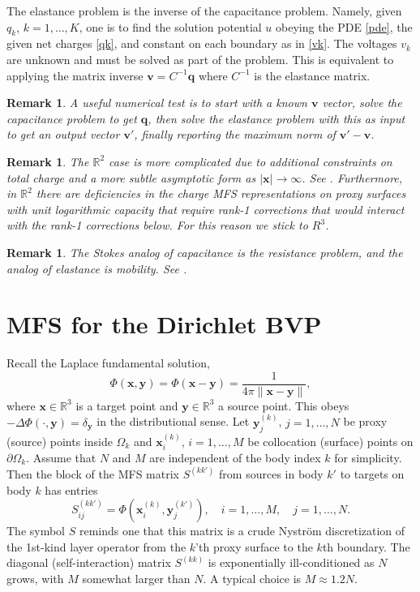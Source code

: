 \documentclass[10pt]{article}
\newcommand{\be}{\begin{equation}}
\newcommand{\ee}{\end{equation}}
\newcommand{\R}{\mathbb{R}}
\newtheorem{rmk}[thm]{Remark}
\newcommand{\x}{\mathbf{x}}
\newcommand{\y}{\mathbf{y}}
\newcommand{\vv}{\mathbf{v}}
\newcommand{\qq}{\mathbf{q}}
\newcommand{\pO}{\partial\Omega}
\newcommand{\ok}{^{(k)}}
\newcommand{\okp}{^{(k')}}
\begin{document}
The elastance problem is the inverse of the capacitance problem.
Namely, given $q_k$, $k=1,\dots,K$, one is to find
the solution potential $u$ obeying the PDE \eqref{pde},
the given net charges \eqref{qk}, and
constant on each boundary as in \eqref{vk}.
The voltages $v_k$ are unknown and must be solved as part of the problem.
This is equivalent to applying the matrix inverse
$\vv = C^{-1} \qq$ where $C^{-1}$ is the elastance matrix.

\begin{rmk}
A useful numerical test is to start with a known $\vv$ vector,
solve the capacitance problem to get $\qq$, then solve the elastance
problem with this as input to get an output vector $\vv'$,
finally reporting the maximum norm of $\vv'-\vv$.
\end{rmk}

\begin{rmk}
  The $\R^2$ case is more complicated due to additional constraints
  on total charge and a more subtle asymptotic form as $|\x|\to\infty$.
  See \cite{mobility}.
  Furthermore, in $\R^2$ there are deficiencies in the charge
  MFS representations on proxy surfaces with unit logarithmic capacity
  \cite{qfs} that require rank-1 corrections that would interact with the
  rank-1 corrections below. For this reason we stick to $R^3$.
  \end{rmk}

\begin{rmk}
  The Stokes analog of capacitance is the resistance problem,
  and the analog of elastance is mobility. See \cite{mobility}.
  \end{rmk}

\section{MFS for the Dirichlet BVP}

Recall the Laplace fundamental solution,
\be
\Phi(\x,\y) = \Phi(\x-\y) = \frac{1}{4\pi \|\x-\y\|},
\ee
where $\x\in\R^3$ is a target point and $\y\in\R^3$ a source point.
This obeys $-\Delta \Phi(\cdot,\y) = \delta_\y$ in the distributional
sense.
Let $\y\ok_j$, $j=1,\dots,N$ be proxy (source) points inside $\Omega_k$
and $\x\ok_i$, $i=1,\dots,M$ be collocation (surface) points on $\pO_k$.
Assume that $N$ and $M$ are independent of the body index $k$ for simplicity.
Then the block of the MFS matrix $S^{(kk')}$
from sources in body $k'$ to targets on body $k$
has entries
\be
S^{(kk')}_{ij} = \Phi(\x\ok_i,\y\okp_j), \quad i=1,\dots,M, \quad j=1,\dots,N.
\ee
The symbol $S$ reminds one that this matrix is a crude Nystr\"om
discretization of the 1st-kind layer operator from the $k$'th proxy surface
to the $k$th boundary.
The diagonal (self-interaction) matrix $S^{(kk)}$
is exponentially ill-conditioned as $N$ grows, with $M$ somewhat
larger than $N$. A typical choice is $M\approx 1.2 N$.
\end{document}
